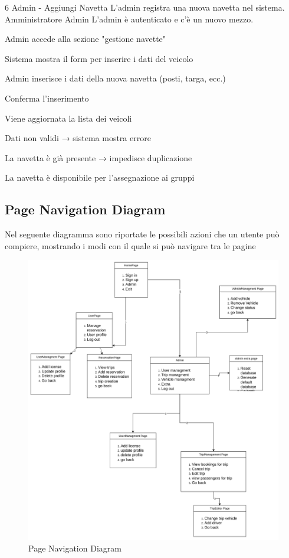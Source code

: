 \UseCase
{6}
{Admin - Aggiungi Navetta}
{L’admin registra una nuova navetta nel sistema.}
{Amministratore}
{Admin}
{L’admin è autenticato e c'è un nuovo mezzo.}
{\begin{description}[nosep]
    \item[1.] Admin accede alla sezione "gestione navette"
    \item[2.] Sistema mostra il form per inserire i dati del veicolo
    \item[3.] Admin inserisce i dati della nuova navetta (posti, targa, ecc.)
    \item[4.] Conferma l’inserimento
    \item[5.] Viene aggiornata la lista dei veicoli
\end{description}}
{\begin{description}[nosep]
    \item[2a.] Dati non validi → sistema mostra errore
    \item[3a.] La navetta è già presente → impedisce duplicazione
\end{description}}
{La navetta è disponibile per l’assegnazione ai gruppi}




\subsection{Page Navigation Diagram}
Nel seguente diagramma sono riportate le possibili azioni che un utente può compiere, mostrando i modi con il quale si può navigare tra le pagine
\begin{figure}[H]
    \centering
    \includegraphics[width=1\linewidth]{Images/PageNavigation_diag.png}
    \caption{Page Navigation Diagram}
    \label{fig:PageNavdiag}
\end{figure}
